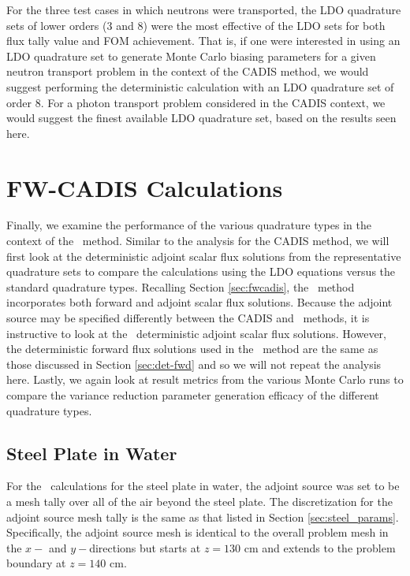 For the three test cases in which neutrons were transported, the LDO quadrature sets 
of lower orders (3 and 8) were the most effective of the LDO sets for both flux tally
value and FOM achievement. That is, if one were interested in using an LDO quadrature
set to generate Monte Carlo biasing parameters for a given neutron transport problem
in the context of the CADIS method, we would suggest performing the deterministic
calculation with an LDO quadrature set of order 8. For a photon transport problem
considered in the CADIS context, we would suggest the finest available LDO quadrature
set, based on the results seen here.

\FloatBarrier
\section{FW-CADIS Calculations}

Finally, we examine the performance of the various quadrature types in the context of
the \fwc\ method. Similar to the analysis for the CADIS method, we will first look at 
the deterministic adjoint scalar flux solutions from the representative quadrature 
sets to compare the calculations using the LDO equations versus the standard 
quadrature types. Recalling Section \ref{sec:fwcadis}, the \fwc\ method incorporates 
both forward and adjoint scalar flux solutions. Because the adjoint source may be
specified differently between the CADIS and \fwc\ methods, it is instructive to look
at the \fwc\ deterministic adjoint scalar flux solutions. However, the deterministic
forward flux solutions used in the \fwc\ method are the same as those discussed
in Section \ref{sec:det-fwd} and so we will not repeat the analysis here. Lastly, we
again look at result metrics from the various Monte Carlo runs to compare the variance
reduction parameter generation efficacy of the different quadrature types.

\subsection{Steel Plate in Water}

For the \fwc\ calculations for the steel plate in water, the adjoint source was set to
be a mesh tally over all of the air beyond the steel plate. The discretization for the
adjoint source mesh tally is the same as that listed in 
Section \ref{sec:steel_params}. Specifically, the adjoint source mesh is identical to
the overall problem mesh in the $x-$ and $y-$directions but starts at $z = 130$ cm and
extends to the problem boundary at $z = 140$ cm.

